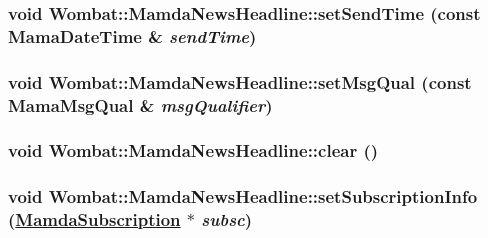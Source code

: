 \hypertarget{classWombat_1_1MamdaNewsHeadline_1be211c11535f625ccef032b47ef0ad4}{
\subsubsection[setSendTime]{\setlength{\rightskip}{0pt plus 5cm}void Wombat::Mamda\-News\-Headline::set\-Send\-Time (const Mama\-Date\-Time \& {\em send\-Time})}}
\label{classWombat_1_1MamdaNewsHeadline_1be211c11535f625ccef032b47ef0ad4}


\hypertarget{classWombat_1_1MamdaNewsHeadline_8554790251af05f5d40d31fe21670ecc}{
\subsubsection[setMsgQual]{\setlength{\rightskip}{0pt plus 5cm}void Wombat::Mamda\-News\-Headline::set\-Msg\-Qual (const Mama\-Msg\-Qual \& {\em msg\-Qualifier})}}
\label{classWombat_1_1MamdaNewsHeadline_8554790251af05f5d40d31fe21670ecc}


\hypertarget{classWombat_1_1MamdaNewsHeadline_a18c0a1c232820c36523f6da4c8cdcab}{
\subsubsection[clear]{\setlength{\rightskip}{0pt plus 5cm}void Wombat::Mamda\-News\-Headline::clear ()}}
\label{classWombat_1_1MamdaNewsHeadline_a18c0a1c232820c36523f6da4c8cdcab}


\hypertarget{classWombat_1_1MamdaNewsHeadline_2d2ebc17818911fcb02614e4adfa1c66}{
\subsubsection[setSubscriptionInfo]{\setlength{\rightskip}{0pt plus 5cm}void Wombat::Mamda\-News\-Headline::set\-Subscription\-Info (\hyperlink{classWombat_1_1MamdaSubscription}{Mamda\-Subscription} $\ast$ {\em subsc})}}
\label{classWombat_1_1MamdaNewsHeadline_2d2ebc17818911fcb02614e4adfa1c66}


